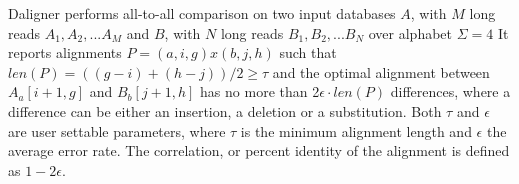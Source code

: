 \documentclass[../thesis.tex]{../ce}
\begin{document}
Daligner performs all-to-all comparison on two input databases $A$, with $M$ long reads $A_1, A_2,...A_M$ and $B$, with $N$ long reads $B_1, B_2,...B_N$ over alphabet $\Sigma = 4$
 It reports alignments $P = (a,i,g)x(b,j,h)$ such that $len(P) = ((g-i)+(h-j))/2 \ge \tau$ and the optimal alignment between $A_a[i+1,g]$ and $B_b[j+1,h]$ has no more than 2$\epsilon \cdot len(P)$ differences, where a difference can be either an insertion, a deletion or a substitution.
Both $\tau$ and $\epsilon$ are user settable parameters, where $\tau$ is the minimum alignment length and $\epsilon$ the average error rate.
The correlation, or percent identity of the alignment is defined as $1-2\epsilon$.
\end{document}

